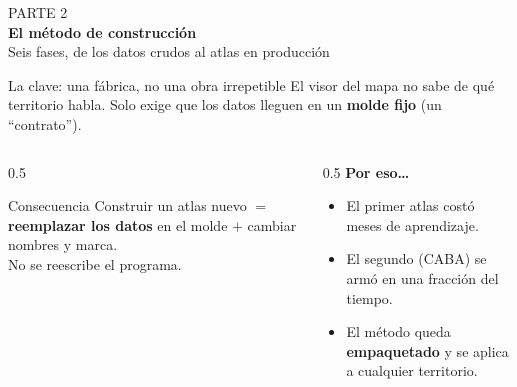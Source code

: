 \documentclass[aspectratio=169,11pt]{beamer}
\newcommand{\lead}[1]{{\color{tPrimary}\large #1}\par\medskip}
\begin{document}
\begin{frame}[plain]
\vfill
\centering
{\color{white}\ttfamily\small PARTE 2}\\[0.4em]
{\color{white}\Huge\bfseries El método de construcción}\\[0.4em]
{\color{tAccentL}\large Seis fases, de los datos crudos al atlas en producción}
\vfill
\end{frame}

\begin{frame}{La clave: una fábrica, no una obra irrepetible}
\lead{El visor del mapa no sabe de qué territorio habla. Solo exige que los datos lleguen en un \textbf{molde fijo} (un ``contrato'').}
\begin{columns}[T]
\begin{column}{0.5\textwidth}
\begin{block}{Consecuencia}
Construir un atlas nuevo $=$ \textbf{reemplazar los datos} en el molde $+$ cambiar nombres y marca.\\[4pt] No se reescribe el programa.
\end{block}
\end{column}
\begin{column}{0.5\textwidth}
\textbf{\color{tPrimary}Por eso\dots}
\begin{itemize}\footnotesize
  \item El primer atlas costó meses de aprendizaje.
  \item El segundo (CABA) se armó en una fracción del tiempo.
  \item El método queda \textbf{empaquetado} y se aplica a cualquier territorio.
\end{itemize}
\end{column}
\end{columns}
\end{frame}
\end{document}
